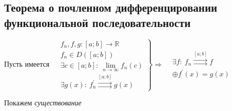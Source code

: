 \documentclass[a4paper, 10pt]{article}
\begin{document}
\subsection{Теорема о почленном дифференцировании функциональной последовательности}
\theorem Пусть имеется $\left.\begin{aligned}
    &f_n,f,g:[a;b]\to\mathbb{R}\\
    &f_n\in D([a;b])\\
    &\exists c\in[a;b]:\ \lim\limits_{n\to\infty} f_n(c)\\
    &\exists g(x):\ f^{\prime}_n\overset{[a;b]}{\rightrightarrows}g(x)
\end{aligned}\right\}\Longrightarrow \begin{aligned}
    &\exists f:\ f_n\overset{[a;b]}{\rightrightarrows}f\\
    &\oplus f^{\prime}(x)=g(x)
\end{aligned}$

\proof Покажем \textit{существование}
    
\end{document}
